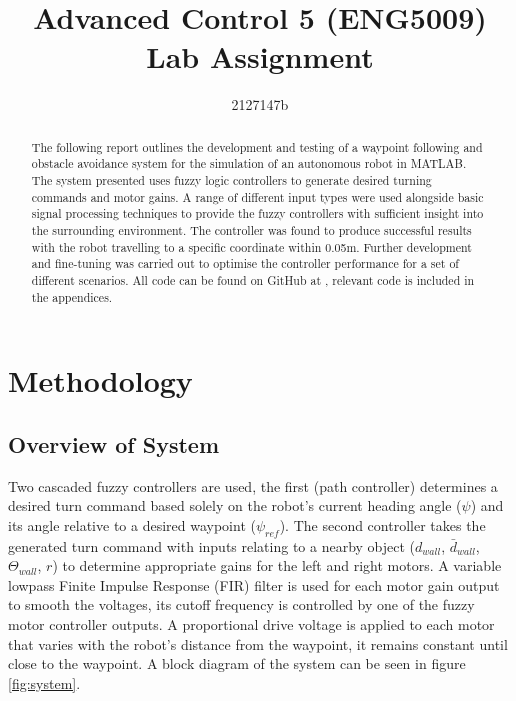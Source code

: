 \documentclass[10pt]{article}
\begin{document}
\title{Advanced Control 5 (ENG5009) \\ \large{Lab Assignment}}
\author{2127147b}
\maketitle

\begin{abstract}
    The following report outlines the development and testing of a waypoint following and obstacle avoidance system for the simulation of an autonomous robot in MATLAB.
    The system presented uses fuzzy logic controllers to generate desired turning commands and motor gains. 
    A range of different input types were used alongside basic signal processing techniques to provide the fuzzy controllers with sufficient insight into the surrounding environment.
    The controller was found to produce successful results with the robot travelling to a specific coordinate within 0.05m. 
    Further development and fine-tuning was carried out to optimise the controller performance for a set of different scenarios.
    All code can be found on GitHub at \cite{github}, relevant code is included in the appendices.  
    \end{abstract}

\section{Methodology}
\subsection{Overview of System}
Two cascaded fuzzy controllers are used, the first (path controller) determines a desired turn command based solely on the robot's current heading angle ($\psi$) and its angle relative to a desired waypoint ($\psi_{ref}$).
The second controller takes the generated turn command with inputs relating to a nearby object ($d_{wall}$, $\bar{d}_{wall}$, $\Theta_{wall}$, $r$) to determine appropriate gains for the left and right motors.
A variable lowpass Finite Impulse Response (FIR) filter is used for each motor gain output to smooth the voltages, its cutoff frequency is controlled by one of the fuzzy motor controller outputs.
A proportional drive voltage is applied to each motor that varies with the robot's distance from the waypoint, it remains constant until close to the waypoint. 
A block diagram of the system can be seen in figure \ref{fig:system}.
\end{document}

